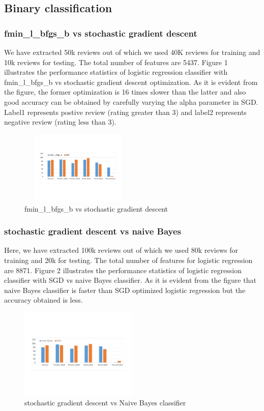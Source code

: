 \documentclass{article}
\begin{document}
\subsection{Binary classification}
\subsubsection{fmin\_l\_bfgs\_b vs stochastic gradient descent}
We have extracted 50k reviews out of which we used 40K reviews for training and 10k reviews for testing. The total number of features are 5437. 
Figure 1 illustrates the performance statistics of logistic regression classifier with fmin\_l\_bfgs\_b vs stochastic gradient descent optimization. As it is evident from the figure, the former optimization is 16 times slower than the latter and also good accuracy can be obtained by carefully varying the alpha parameter in SGD. Label1 represents postive review (rating greater than 3) and label2 represents negative review (rating less than 3).

\begin{figure}[H]
  \caption{fmin\_l\_bfgs\_b vs stochastic gradient descent}
  \centering
    \includegraphics[width=0.5\textwidth,height=3.5cm]{newtemp}
\end{figure}


\subsubsection{stochastic gradient descent vs naive Bayes}
Here, we have extracted 100k reviews out of which we used 80k reviews for training and 20k for testing. The total number of features for logistic regression are 8871. Figure 2 illustrates the performance statistics of logistic regression classifier with SGD vs naive Bayes classifier.  As it is evident from the figure that naive Bayes classifier is faster than SGD optimized logistic regression but the accuracy obtained is less.
\begin{figure}[H]
  \caption{stochastic gradient descent vs Naive Bayes classifier}
  \centering
    \includegraphics[width=0.5\textwidth]{sgdvsbayes}
\end{figure}
\end{document}
